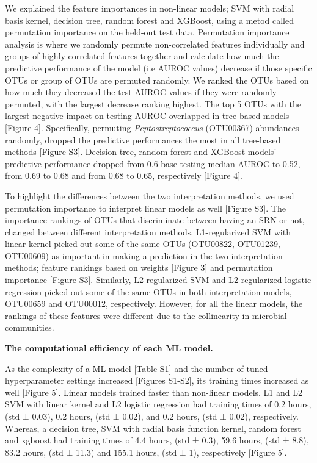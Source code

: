 \documentclass[11pt,]{article}
\begin{document}
We explained the feature importances in non-linear models; SVM with
radial basis kernel, decision tree, random forest and XGBoost, using a
metod called permutation importance on the held-out test data.
Permutation importance analysis is where we randomly permute
non-correlated features individually and groups of highly correlated
features together and calculate how much the predictive performance of
the model (i.e AUROC values) decrease if those specific OTUs or group of
OTUs are permuted randomly. We ranked the OTUs based on how much they
decreased the test AUROC values if they were randomly permuted, with the
largest decrease ranking highest. The top 5 OTUs with the largest
negative impact on testing AUROC overlapped in tree-based models
{[}Figure 4{]}. Specifically, permuting \emph{Peptostreptococcus}
(OTU00367) abundances randomly, dropped the predictive performances the
most in all tree-based methods {[}Figure S3{]}. Decision tree, random
forest and XGBoost models' predictive performance dropped from 0.6 base
testing median AUROC to 0.52, from 0.69 to 0.68 and from 0.68 to 0.65,
respectively {[}Figure 4{]}.

To highlight the differences between the two interpretation methods, we
used permutation importance to interpret linear models as well {[}Figure
S3{]}. The importance rankings of OTUs that discriminate between having
an SRN or not, changed between different interpretation methods.
L1-regularized SVM with linear kernel picked out some of the same OTUs
(OTU00822, OTU01239, OTU00609) as important in making a prediction in
the two interpretation methods; feature rankings based on weights
{[}Figure 3{]} and permutation importance {[}Figure S3{]}. Similarly,
L2-regularized SVM and L2-regularized logistic regression picked out
some of the same OTUs in both interpretation models, OTU00659 and
OTU00012, respectively. However, for all the linear models, the rankings
of these features were different due to the collinearity in microbial
communities.

\textbf{The computational efficiency of each ML model.}

As the complexity of a ML model {[}Table S1{]} and the number of tuned
hyperparameter settings increased {[}Figures S1-S2{]}, its training
times increased as well {[}Figure 5{]}. Linear models trained faster
than non-linear models. L1 and L2 SVM with linear kernel and L2 logistic
regression had training times of 0.2 hours, (std ± 0.03), 0.2 hours,
(std ± 0.02), and 0.2 hours, (std ± 0.02), respectively. Whereas, a
decision tree, SVM with radial basis function kernel, random forest and
xgboost had training times of 4.4 hours, (std ± 0.3), 59.6 hours, (std ±
8.8), 83.2 hours, (std ± 11.3) and 155.1 hours, (std ± 1), respectively
{[}Figure 5{]}.
\end{document}
